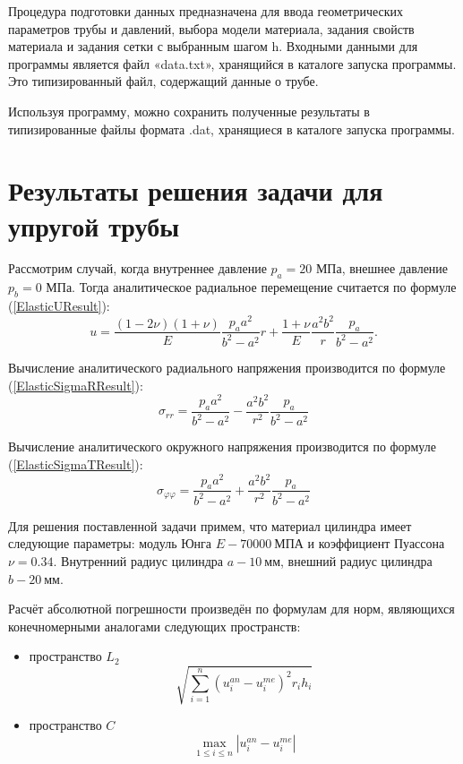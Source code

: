 \documentclass[a4paper,14pt]{extarticle}
\begin{document}
Процедура подготовки данных предназначена для ввода геометрических параметров трубы и давлений, выбора модели материала, задания свойств материала и задания сетки с выбранным шагом h. Входными данными для программы является файл «data.txt», хранящийся в каталоге запуска программы. Это типизированный файл, содержащий данные о трубе. 

Используя программу, можно сохранить полученные результаты в типизированные файлы формата .dat, хранящиеся в каталоге запуска программы. 

\newpage

\section{Результаты решения задачи для упругой трубы}

Рассмотрим случай, когда внутреннее давление $p_a=20$ МПа, внешнее давление $p_b=0$ МПа. Тогда аналитическое радиальное перемещение считается по формуле (\ref{ElasticUResult}):
\begin{equation}\label{perem}
u=\frac{\left(1-2\nu\right)\left(1+\nu\right)}{E} \frac{p_a a^2}{b^2-a^2}r+\frac{1+\nu}{E}\frac{a^2 b^2}{r}\frac{p_a}{b^2-a^2}.
\end{equation}

Вычисление аналитического радиального напряжения производится по формуле (\ref{ElasticSigmaRResult}):
\begin{equation}
\sigma_{rr}=\frac{p_a a^2}{b^2-a^2}-\frac{a^2 b^2}{r^2}\frac{p_a}{b^2 -a^2}
\end{equation}

Вычисление аналитического окружного напряжения производится по формуле (\ref{ElasticSigmaTResult}):
\begin{equation}
\sigma_{\varphi\varphi}=\frac{p_a a^2}{b^2-a^2}+\frac{a^2 b^2}{r^2}\frac{p_a}{b^2 -a^2}
\end{equation}	

Для решения поставленной задачи примем, что материал цилиндра имеет следующие параметры: модуль Юнга $E - 70000 \:\text{МПА}$ и коэффициент Пуассона $\nu=0.34$. Внутренний радиус цилиндра $a - 10 \:\text{мм}$, внешний радиус цилиндра $b - 20 \:\text{мм}$.
	
Расчёт абсолютной погрешности произведён по формулам для норм, являющихся конечномерными аналогами следующих пространств:
\begin{itemize}
\item пространство $L_2$
\begin{equation}\label{Error_Ab_L2}
\sqrt{\sum_{i=1}^{n} (u_i^{an}-u_i^{me})^2 r_i h_{i}}
\end{equation}
\item пространство $C$
\begin{equation}\label{Error_Ab_C1}
\max_{1\leq i \leq n} \left|u_i^{an}-u_i^{me}\right|
\end{equation}
\end{itemize}
\end{document}
